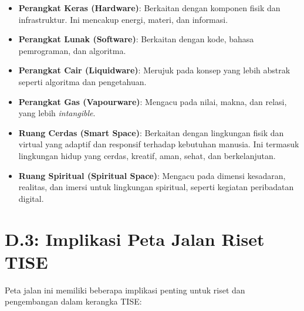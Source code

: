 \documentclass[
  letterpaper,
  DIV=11,
  numbers=noendperiod]{scrreprt}
\providecommand{\tightlist}{%
  \setlength{\itemsep}{0pt}\setlength{\parskip}{0pt}}
\begin{document}
\begin{itemize}
\tightlist
\item
  \textbf{Perangkat Keras (Hardware)}: Berkaitan dengan komponen fisik
  dan infrastruktur. Ini mencakup energi, materi, dan informasi.
\item
  \textbf{Perangkat Lunak (Software)}: Berkaitan dengan kode, bahasa
  pemrograman, dan algoritma.
\item
  \textbf{Perangkat Cair (Liquidware)}: Merujuk pada konsep yang lebih
  abstrak seperti algoritma dan pengetahuan.
\item
  \textbf{Perangkat Gas (Vapourware)}: Mengacu pada nilai, makna, dan
  relasi, yang lebih \emph{intangible}.
\item
  \textbf{Ruang Cerdas (Smart Space)}: Berkaitan dengan lingkungan fisik
  dan virtual yang adaptif dan responsif terhadap kebutuhan manusia. Ini
  termasuk lingkungan hidup yang cerdas, kreatif, aman, sehat, dan
  berkelanjutan.
\item
  \textbf{Ruang Spiritual (Spiritual Space)}: Mengacu pada dimensi
  kesadaran, realitas, dan imersi untuk lingkungan spiritual, seperti
  kegiatan peribadatan digital.
\end{itemize}

\section{\texorpdfstring{\textbf{D.3: Implikasi Peta Jalan Riset
TISE}}{D.3: Implikasi Peta Jalan Riset TISE}}\label{d.3-implikasi-peta-jalan-riset-tise}

Peta jalan ini memiliki beberapa implikasi penting untuk riset dan
pengembangan dalam kerangka TISE:
\end{document}
